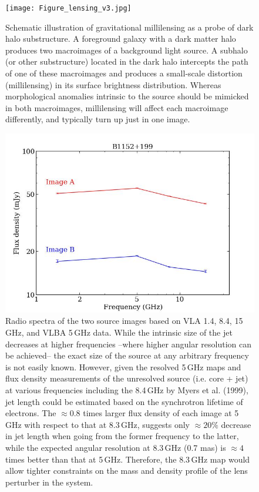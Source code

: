 \documentclass[a4paper, 11pt]{article}
\begin{document}
\begin{figure}[t]
\centering
\texttt{[image: Figure\_lensing\_v3.jpg]}
\caption{Schematic illustration of gravitational millilensing as a probe of dark halo substructure. A foreground galaxy with a dark matter halo produces two macroimages of a background light source. A subhalo (or other substructure) located in the dark halo intercepts the path of one of these macroimages and produces a small-scale distortion (millilensing) in its surface brightness distribution. Whereas morphological anomalies intrinsic to the source should be mimicked in both macroimages, millilensing will affect each macroimage differently, and typically turn up just in one image.}
\end{figure}

\begin{figure}[b]
\centering
\includegraphics[scale=0.4]{Figure_spectrum.jpg}
\caption{Radio spectra of the two source images based on VLA 1.4, 8.4, 15\,GHz, and VLBA 5\,GHz data. While the intrinsic size of the jet decreases at higher frequencies --where higher angular resolution can be achieved-- the exact size of the source at any arbitrary frequency is not easily known. However, given the resolved 5\,GHz maps and flux density measurements of the unresolved source (i.e. core + jet) at various frequencies including the 8.4\,GHz by Myers et al. (1999), jet length could be estimated based on the synchrotron lifetime of electrons. The $\approx 0.8$ times larger flux density of each image at 5\,GHz with respect to that at 8.3\,GHz, suggests only $\approx 20\%$ decrease in jet length when going from the former frequency to the latter, while the expected angular resolution at 8.3\,GHz (0.7 mas) is $\approx 4$ times better than that at 5\,GHz. Therefore, the 8.3\,GHz map would allow tighter constraints on the mass and density profile of the lens perturber in the system.}
\end{figure}
\end{document}
